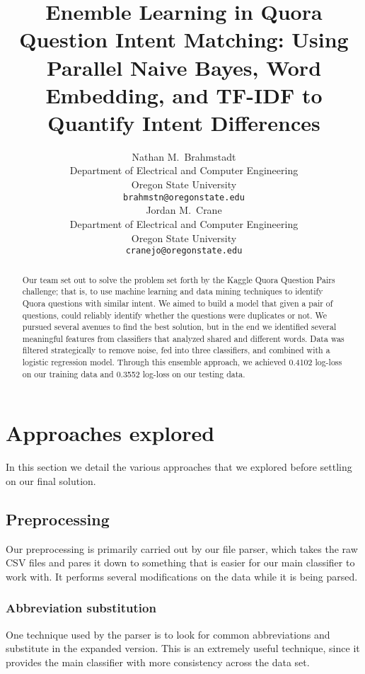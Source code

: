 \documentclass{article}
\title{Enemble Learning in Quora Question Intent Matching:
Using Parallel Naive Bayes, Word Embedding, and TF-IDF to Quantify Intent Differences}
\author{
  Nathan M.~Brahmstadt \\
  Department of Electrical and Computer Engineering\\
  Oregon State University\\
  \texttt{brahmstn@oregonstate.edu} \\
  \And
  Jordan M.~Crane \\
  Department of Electrical and Computer Engineering \\
  Oregon State University \\
  \texttt{cranejo@oregonstate.edu} \\
}
\begin{document}

\maketitle

\begin{abstract}
	Our team set out to solve the problem set forth by the Kaggle Quora Question
    Pairs challenge; that is, to use machine learning and data mining techniques
    to identify Quora questions with similar intent. We aimed to build a model
    that given a pair of questions, could reliably identify whether the
    questions were duplicates or not. We pursued several avenues to find the
    best solution, but in the end we identified several 
    meaningful features from classifiers that analyzed shared and different words. Data was filtered 
    strategically to remove noise, fed into three classifiers, 
    and combined with a logistic regression model. Through this ensemble approach, we 
    achieved 0.4102 log-loss on our training data and 0.3552 log-loss on our testing data.

\end{abstract}

\section{Approaches explored}

In this section we detail the various approaches that we explored before
settling on our final solution.

\subsection{Preprocessing}

Our preprocessing is primarily carried out by our file parser, which takes the
raw CSV files and pares it down to something that is easier for our main
classifier to work with. It performs several modifications on the data while it
is being parsed.

\subsubsection{Abbreviation substitution}

One technique used by the parser is to look for common abbreviations and
substitute in the expanded version. This is an extremely useful technique, since
it provides the main classifier with more consistency across the data set.
\end{document}
